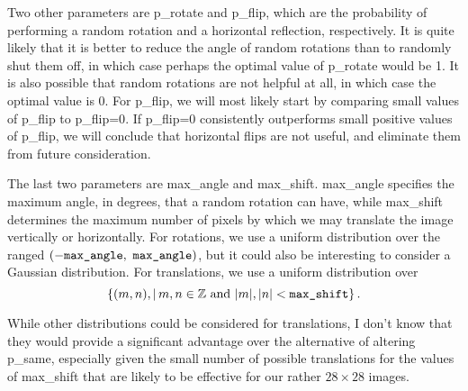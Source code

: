 Two other parameters are {\ttfamily p\_rotate} and {\ttfamily p\_flip}, which are the probability of performing a random rotation and a horizontal reflection, respectively. It is quite likely that it is better to reduce the angle of random rotations than to randomly shut them off, in which case perhaps the optimal value of {\ttfamily p\_rotate} would be 1. It is also possible that random rotations are not helpful at all, in which case the optimal value is 0. For {\ttfamily p\_flip}, we will most likely start by comparing small values of {\ttfamily p\_flip} to {\ttfamily p\_flip=0}. If {\ttfamily p\_flip=0} consistently outperforms small positive values of  {\ttfamily p\_flip}, we will conclude that horizontal flips are not useful, and eliminate them from future consideration.

The last two parameters are {\ttfamily max\_angle} and {\ttfamily max\_shift}. {\ttfamily max\_angle} specifies the maximum angle, in degrees, that a random rotation can have, while {\ttfamily max\_shift} determines the maximum number of pixels by which we may translate the image vertically or horizontally. For rotations, we use a uniform distribution over the ranged $(-\textrm{\ttfamily max\_angle},\ \textrm{\ttfamily max\_angle})$, but it could also be interesting to consider a Gaussian distribution. For translations, we use a uniform distribution over \[\{(m,n)\\,|\,m,n \in\mathbb{Z}\textrm{\ and\ }|m|,|n|<\textrm{\ttfamily max\_shift}\}\,.\]

While other distributions could be considered for translations, I don't know that they would provide a significant advantage over the alternative of altering {\ttfamily p\_same}, especially given the small number of possible translations for the values of {\ttfamily max\_shift} that are likely to be effective for our rather $28\times 28$ images.